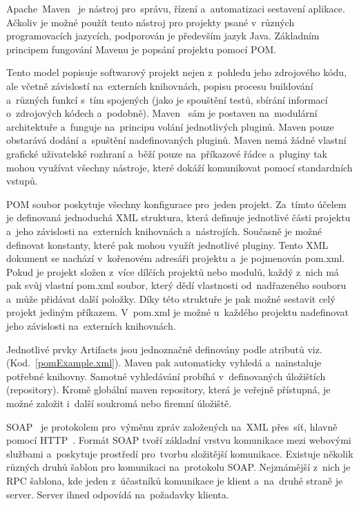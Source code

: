 Apache~Maven~\cite{apache-maven} je nástroj pro~správu, řízení a~automatizaci sestavení aplikace. Ačkoliv je možné použít tento nástroj pro projekty psané v~různých programovacích jazycích, podporován je především jazyk Java. Základním principem fungování Mavenu je popsání projektu pomocí POM. 


Tento model popisuje softwarový projekt nejen z~pohledu jeho zdrojového kódu, ale včetně závislostí na~externích knihovnách, popisu procesu buildování a~různých funkcí s~tím spojených (jako je spouštění testů, sbírání informací o~zdrojových kódech a~podobně). Maven~\cite{maven-lit} sám je postaven na~modulární architektuře a~funguje na~principu volání jednotlivých pluginů. Maven pouze obstarává dodání a~spuštění nadefinovaných pluginů. Maven nemá žádné vlastní grafické uživatelské rozhraní a~běží pouze na~příkazové řádce a~pluginy tak mohou využívat všechny nástroje, které dokáží komunikovat pomocí standardních vstupů. 

POM soubor poskytuje všechny konfigurace pro~jeden projekt. Za~tímto účelem je definovaná jednoduchá XML struktura, která definuje jednotlivé části projektu a~jeho závislosti na~externích knihovnách a~nástrojích. Současně je možné definovat konstanty, které pak mohou využít jednotlivé pluginy. Tento XML dokument se nachází v~kořenovém adresáři projektu a~je pojmenován pom.xml. Pokud je projekt složen z~více dílčích projektů nebo modulů, každý z~nich má pak svůj vlastní pom.xml soubor, který dědí vlastnosti od~nadřazeného souboru a~může přidávat další položky. Díky této struktuře je pak možné sestavit celý projekt jediným příkazem. V~pom.xml je možné u~každého projektu nadefinovat jeho závislosti na~externích knihovnách.

Jednotlivé prvky Artifacts jsou jednoznačně definovány podle atributů viz. (Kod.~\ref{pomExample.xml}). Maven pak automaticky vyhledá a~nainstaluje potřebné knihovny. Samotné vyhledávání probíhá v~definovaných úložištích (repository). Kromě globální maven repository, která je veřejně přístupná, je možné založit i~další soukromá nebo firemní úložiště.


SOAP~\cite{soap} je protokolem pro~výměnu zpráv založených na~XML přes~síť, hlavně pomocí HTTP~\cite{http}. Formát SOAP tvoří základní vrstvu komunikace mezi webovými službami a~poskytuje prostředí pro~tvorbu složitější komunikace. Existuje několik různých druhů šablon pro komunikaci na~protokolu SOAP. Nejznámější z~nich je RPC šablona, kde jeden z~účastníků komunikace je klient a~na~druhé straně je server. Server ihned odpovídá na~požadavky klienta.

